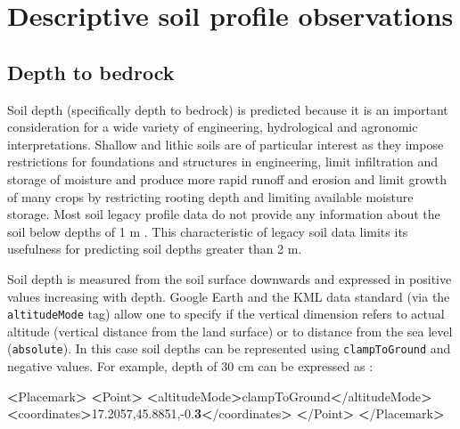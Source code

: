 \documentclass[11pt]{krantz}
\newenvironment{Shaded}{\begin{snugshade}}{\end{snugshade}}
\newcommand{\ExtensionTok}[1]{#1}
\newcommand{\NormalTok}[1]{#1}
\newcommand{\OperatorTok}[1]{\textcolor[rgb]{0.43,0.43,0.43}{\textbf{#1}}}
\theoremstyle{definition}
\theoremstyle{definition}
\theoremstyle{definition}
\theoremstyle{remark}
\begin{document}
\hypertarget{descriptive-soil-profile-observations}{%
\section{Descriptive soil profile
observations}\label{descriptive-soil-profile-observations}}

\hypertarget{depth-to-bedrock}{%
\subsection{Depth to bedrock}\label{depth-to-bedrock}}

Soil depth (specifically depth to bedrock) is predicted because it is an
important consideration for a wide variety of engineering, hydrological
and agronomic interpretations. Shallow and lithic soils are of
particular interest as they impose restrictions for foundations and
structures in engineering, limit infiltration and storage of moisture
and produce more rapid runoff and erosion and limit growth of many crops
by restricting rooting depth and limiting available moisture storage.
Most soil legacy profile data do not provide any information about the
soil below depths of 1 m \citep{Richter1995}. This characteristic of
legacy soil data limits its usefulness for predicting soil depths
greater than 2 m.

Soil depth is measured from the soil surface downwards and expressed in
positive values increasing with depth. Google Earth and the KML data
standard (via the \texttt{altitudeMode} tag) allow one to specify if the
vertical dimension refers to actual altitude (vertical distance from the
land surface) or to distance from the sea level (\texttt{absolute}). In
this case soil depths can be represented using \texttt{clampToGround}
and negative values. For example, depth of 30 cm can be expressed as
\citep{OGCKML2008}:

\begin{Shaded}
\begin{Highlighting}[]
\OperatorTok{<}\ExtensionTok{Placemark}\OperatorTok{>} \OperatorTok{<}\NormalTok{Point}\OperatorTok{>}
\OperatorTok{<}\ExtensionTok{altitudeMode}\OperatorTok{>}\NormalTok{clampToGround}\OperatorTok{<}\NormalTok{/altitudeMode}\OperatorTok{>}
\OperatorTok{<}\ExtensionTok{coordinates}\OperatorTok{>}\NormalTok{17.2057,45.8851,-0.}\OperatorTok{3<}\NormalTok{/coordinates}\OperatorTok{>}
\OperatorTok{<}\NormalTok{/}\ExtensionTok{Point}\OperatorTok{>} \OperatorTok{<}\NormalTok{/Placemark}\OperatorTok{>}
\end{Highlighting}
\end{Shaded}
\end{document}
